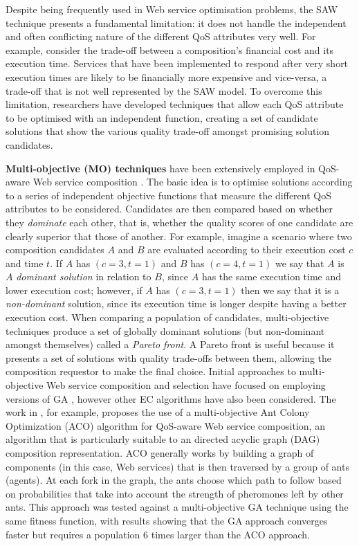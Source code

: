 Despite being frequently used in Web service optimisation problems, the SAW technique presents a fundamental limitation: it does not handle the independent and often conflicting nature of the different QoS attributes very well. For example, consider the trade-off between a composition's financial cost and its execution time. Services that have been implemented to respond after very short execution times are likely to be financially more expensive and vice-versa, a trade-off that is not well represented by the SAW model. To overcome this limitation, researchers have developed techniques that allow each QoS attribute to be optimised with an independent function, creating a set of candidate solutions that show the various quality trade-off amongst promising solution candidates.

\textbf{Multi-objective (MO) techniques} have been extensively employed in QoS-aware Web service composition \cite{liu2005dynamic,zhang2010qos,yu2013efficient,yin2014hybrid,xiang2014qos,chen2014partial}. The basic idea is to optimise solutions according to a series of independent objective functions that measure the different QoS attributes to be considered. Candidates are then compared based on whether they \textit{dominate} each other, that is, whether the quality scores of one candidate are clearly superior that those of another. For example, imagine a scenario where two composition candidates $A$ and $B$ are evaluated according to their execution cost $c$ and time $t$. If $A$ has $(c=3,t=1)$ and $B$ has $(c=4,t=1)$ we say that $A$ is $A$ \textit{dominant solution} in relation to $B$, since $A$ has the same execution time and lower execution cost; however, if $A$ has $(c=3,t=1)$ then we say that it is a \textit{non-dominant} solution, since its execution time is longer despite having a better execution cost. When comparing a population of candidates, multi-objective techniques produce a set of globally dominant solutions (but non-dominant amongst themselves) called a \textit{Pareto front}. A Pareto front is useful because it presents a set of solutions with quality trade-offs between them, allowing the composition requestor to make the final choice. Initial approaches to multi-objective Web service composition and selection have focused on employing versions of GA \cite{liu2005dynamic}, however other EC algorithms have also been considered. The work in \cite{zhang2010qos}, for example, proposes the use of a multi-objective Ant Colony Optimization (ACO) algorithm for QoS-aware Web service composition, an algorithm that is particularly suitable to an directed acyclic graph (DAG) composition representation. ACO generally works by building a graph of components (in this case, Web services) that is then traversed by a group of ants (agents). At each fork in the graph, the ants choose which path to follow based on probabilities that take into account the strength of pheromones left by other ants. This approach was tested against a multi-objective GA technique using the same fitness function, with results showing that the GA approach converges faster but requires a population 6 times larger than the ACO approach.

